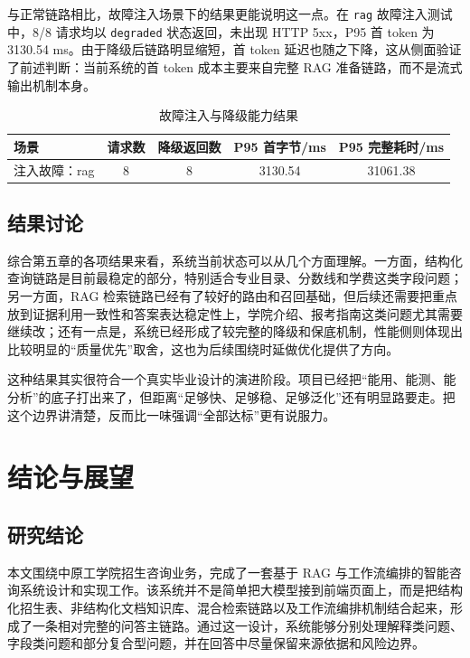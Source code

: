 \documentclass[UTF8,zihao=-4,oneside]{ctexbook}
\numberwithin{equation}{chapter}
\begin{document}
与正常链路相比，故障注入场景下的结果更能说明这一点。在 \texttt{rag} 故障注入测试中，8/8 请求均以 \texttt{degraded} 状态返回，未出现 HTTP 5xx，P95 首 token 为 3130.54 ms\cite{perfreport}。由于降级后链路明显缩短，首 token 延迟也随之下降，这从侧面验证了前述判断：当前系统的首 token 成本主要来自完整 RAG 准备链路，而不是流式输出机制本身。

\begin{table}[H]
  \centering
  \caption{故障注入与降级能力结果}
  \begin{tabular}{lcccc}
    \toprule
    场景 & 请求数 & 降级返回数 & P95 首字节/ms & P95 完整耗时/ms \\
    \midrule
    注入故障：rag & 8 & 8 & 3130.54 & 31061.38 \\
    \bottomrule
  \end{tabular}
\end{table}

\section{结果讨论}
综合第五章的各项结果来看，系统当前状态可以从几个方面理解。一方面，结构化查询链路是目前最稳定的部分，特别适合专业目录、分数线和学费这类字段问题；另一方面，RAG 检索链路已经有了较好的路由和召回基础，但后续还需要把重点放到证据利用一致性和答案表达稳定性上，学院介绍、报考指南这类问题尤其需要继续改；还有一点是，系统已经形成了较完整的降级和保底机制，性能侧则体现出比较明显的“质量优先”取舍，这也为后续围绕时延做优化提供了方向。

这种结果其实很符合一个真实毕业设计的演进阶段。项目已经把“能用、能测、能分析”的底子打出来了，但距离“足够快、足够稳、足够泛化”还有明显路要走。把这个边界讲清楚，反而比一味强调“全部达标”更有说服力。

\chapter{结论与展望}

\section{研究结论}
本文围绕中原工学院招生咨询业务，完成了一套基于 RAG 与工作流编排的智能咨询系统设计和实现工作。该系统并不是简单把大模型接到前端页面上，而是把结构化招生表、非结构化文档知识库、混合检索链路以及工作流编排机制结合起来，形成了一条相对完整的问答主链路。通过这一设计，系统能够分别处理解释类问题、字段类问题和部分复合型问题，并在回答中尽量保留来源依据和风险边界。
\end{document}
